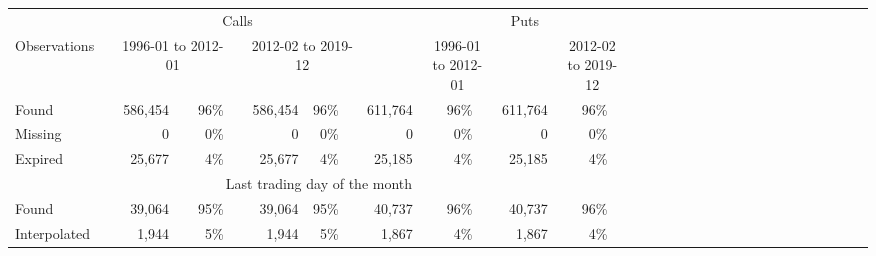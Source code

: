 

		\begin{tabular}{*{2}{l} *{15}{r} }
		       
		        
		         \multicolumn{2}{c}{}  & \multicolumn{7}{c}{Calls}  &  \multicolumn{1}{c}{} & 
		         \multicolumn{7}{c}{Puts} \\
		         
		          
		         \cline{3-9}
		         \cline{11-17}
		       
		         
		          \multicolumn{1}{l}{Observations} &  \multicolumn{1}{l}{} &
		          \multicolumn{3}{c}{1996-01 to 2012-01} & 
		          \multicolumn{1}{c}{} &
			\multicolumn{3}{c}{2012-02 to 2019-12} & 
			\multicolumn{1}{c}{} &
		          \multicolumn{3}{c}{1996-01 to 2012-01} & 
		          \multicolumn{1}{c}{} &
			\multicolumn{3}{c}{2012-02 to 2019-12} & 
		        

		       \hline
		       
		       \multicolumn{17}{c}{All trading days} \\ 
		       
		       \hline 

	
		Found &   & 
		586,454 &  & 96\% & 
		 & 
		 586,454 & 96\% & 
		 & 
		 611,764 &  & 96\% & 
		 & 
		 611,764& &96\% 
		 \\

		
		Missing &   & 
		0 &  & 0\% & 
		 & 
		 0 & 0\% & 
		 & 
		 0 &  & 0\% & 
		 & 
		 0& &0\% 
		 \\

		
		Expired &   & 
		25,677 &  & 4\% & 
		 & 
		 25,677 & 4\% & 
		 & 
		 25,185 &  & 4\% & 
		 & 
		 25,185& &4\% 
		 \\

		
        \hline
        
         \multicolumn{17}{c}{Last trading day of the month} \\

	
		Found &   & 
		39,064 &  & 95\% & 
		 & 
		 39,064 & 95\% & 
		 & 
		 40,737 &  & 96\% & 
		 & 
		 40,737& &96\% 
		 \\

		
		Interpolated &   & 
		1,944 &  & 5\% & 
		 & 
		 1,944 & 5\% & 
		 & 
		 1,867 &  & 4\% & 
		 & 
		 1,867& &4\% 
		 \\

		

	        \hline
	    \end{tabular}
	